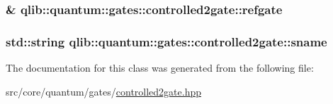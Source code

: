 \subsubsection[{\texorpdfstring{refgate}{refgate}}]{\& qlib\+::quantum\+::gates\+::controlled2gate\+::refgate\hspace{0.3cm}{\ttfamily [private]}}\hypertarget{classqlib_1_1quantum_1_1gates_1_1controlled2gate_abb21342d2206fbc4f7ab4e781997e471}{}\label{classqlib_1_1quantum_1_1gates_1_1controlled2gate_abb21342d2206fbc4f7ab4e781997e471}
\subsubsection[{\texorpdfstring{sname}{sname}}]{\setlength{\rightskip}{0pt plus 5cm}std\+::string qlib\+::quantum\+::gates\+::controlled2gate\+::sname\hspace{0.3cm}{\ttfamily [private]}}\hypertarget{classqlib_1_1quantum_1_1gates_1_1controlled2gate_a32ec87dafda9c4c80af4dc93758f6275}{}\label{classqlib_1_1quantum_1_1gates_1_1controlled2gate_a32ec87dafda9c4c80af4dc93758f6275}


The documentation for this class was generated from the following file\+:\begin{DoxyCompactItemize}
\item 
src/core/quantum/gates/\hyperlink{controlled2gate_8hpp}{controlled2gate.\+hpp}\end{DoxyCompactItemize}
